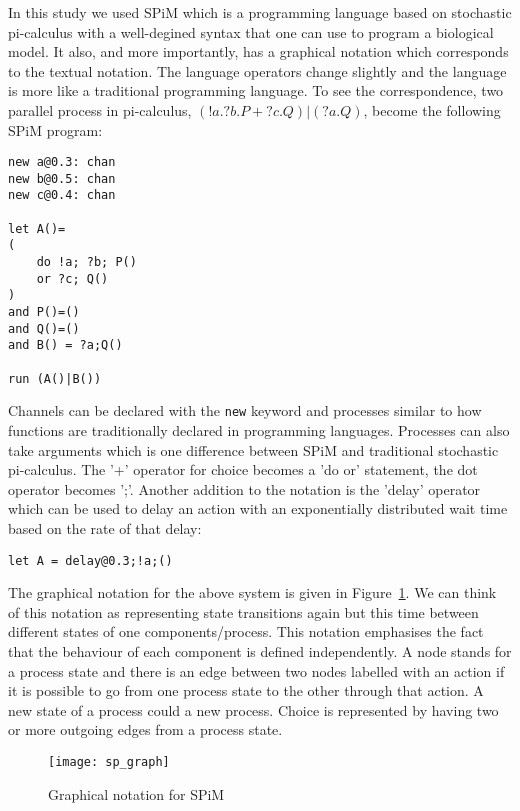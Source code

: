 In this study we used SPiM which is a programming language based on
stochastic pi-calculus with a well-degined syntax that
one can use to program a biological model. It also, and more
importantly, has a graphical notation which corresponds to the textual
notation. The language operators change slightly and the language is
more like a traditional programming language. To see the
correspondence, two parallel process in pi-calculus, $ (!a.?b.P + ?c.Q) |
(?a.Q)$, become the following SPiM program:
\begin{verbatim}
new a@0.3: chan
new b@0.5: chan
new c@0.4: chan

let A()=
(
    do !a; ?b; P()
    or ?c; Q()
)
and P()=()
and Q()=()
and B() = ?a;Q()

run (A()|B())
\end{verbatim}
Channels can be declared with the \texttt{new} keyword and processes
similar to how functions are traditionally declared in programming
languages. Processes can also take arguments which is one difference
between SPiM and traditional stochastic pi-calculus. The '+' operator for choice becomes a 'do or' statement,
the dot operator becomes ';'. Another addition to the notation is the
'delay' operator which can be used to delay an action with an
exponentially distributed wait time based on the rate of that delay:
\begin{verbatim}
let A = delay@0.3;!a;()
\end{verbatim}


The graphical notation for the above
system is given in Figure~\ref{fig:sp_graph}. We can think of this
notation as representing state transitions again but this time between
different states of one components/process. This notation emphasises
the fact that the behaviour of each component is defined
independently. A node stands for a process state and there is an edge
between two nodes labelled with an action if it is possible to go from
one process state to the other through that action. A new state of a
process could a new process. Choice is represented by having two or
more outgoing edges from a process state.

\begin{figure}
\centering
\texttt{[image: sp\_graph]}
\caption{Graphical notation for SPiM}
\label{fig:sp_graph}
\end{figure}

